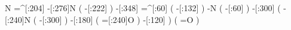             N%
    =^[:204]%
     -[:276]N%
               (
         -[:222]%
               )
     -[:348]%
     =^[:60]%
               (
         -[:132]\phantom{N}%
               )
           -N%
               (
          -[:60]%
               )
     -[:300]%
               (
         -[:240]N%
                   (
             -[:300]%
                   )
         -[:180]%
                   (
             =[:240]O%
                   )
         -[:120]%
               )
               (
               =O%
               )